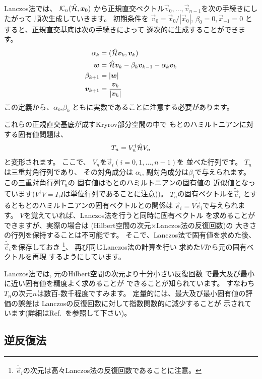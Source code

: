 Lanczos法では、
$\mathcal{K}_{n}(\hat{\mathcal{H}},\boldsymbol x_{0})$
から正規直交ベクトル${\vec{v}_{0},\dots,\vec{v}_{n-1}}$を次の手続きにしたがって
順次生成していきます。
初期条件を
$\vec{v}_{0} =\vec{x}_{0}/|\vec{x}_{0}|$,
$\beta_{0}=0,\vec{x}_{-1}=0$
とすると、正規直交基底は次の手続きによって
逐次的に生成することができます。
\begin{align}
\alpha_{k} &= (\hat{\mathcal{H}}\boldsymbol v_{k},\boldsymbol v_{k}) \\
\boldsymbol w   &= \hat{\mathcal{H}}\boldsymbol v_{k}-\beta_{k}\boldsymbol v_{k-1}-\alpha_{k}\boldsymbol v_{k} \\
\beta_{k+1} &= |\boldsymbol w| \\
\boldsymbol v_{k+1} &= \frac{\boldsymbol v_{k}}{|\boldsymbol v_{k}|}
\end{align}
この定義から、$\alpha_{k}$,$\beta_{k}$
ともに実数であることに注意する必要があります。

これらの正規直交基底が成すKryrov部分空間の中で
もとのハミルトニアンに対する固有値問題は、
\begin{align}
T_{n}=V_{n}^{\dagger}\hat{\mathcal{H}} V_{n}
\end{align}
と変形されます。
ここで、
$V_{n}$を$\vec{v}_{i}(i=0,1,\dots,n-1)$を
並べた行列です。
$T_{n}$は三重対角行列であり、
その対角成分は
$\alpha_{i}$,
副対角成分は$\beta_{i}$で与えられます。
この三重対角行列$T_{n}$の
固有値はもとのハミルトニアンの固有値の
近似値となっています($V^{\dagger}V=I$,$I$は単位行列であることに注意))。
$T_{n}$の固有ベクトルを$\tilde{\vec{e}}_{i}$
とするともとのハミルトニアンの固有ベクトルとの関係は
$\vec{e}_{i}=V\tilde{\vec{e}}_{i}$で与えられます。
$V$を覚えていれば、Lanczos法を行うと同時に固有ベクトル
を求めることができますが、実際の場合は
(Hilbert空間の次元$\times$Lanczos法の反復回数)の
大きさの行列を保持することは不可能です。
そこで、Lanczos法で固有値を求めた後、
$\tilde{\vec{e}_{i}}$を保存しておき
\footnote{$\tilde{\vec{e}_{i}}$の次元は高々Lanczos法の反復回数であることに注意。}、
再び同じLanczos法の計算を行い
求めた$V$から元の固有ベクトルを再現
するようにしています。

Lanczos法では, 
元のHilbert空間の次元より十分小さい反復回数
で最大及び最小に近い固有値を精度よく求めることが
できることが知られています。
すなわち$T_{n}$の次元$n$は数百-数千程度ですみます。
定量的には、最大及び最小固有値の評価の誤差は
Lanczosの反復回数に対して指数関数的に減少することが
示されています(詳細はRef.~\cite{SugiharaMurota}を参照して下さい)。
\subsection{逆反復法}

